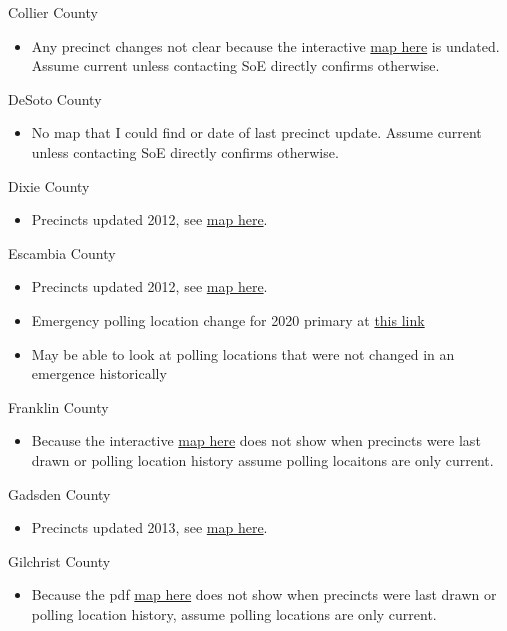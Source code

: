 \documentclass[12pt]{article}
\begin{document}
Collier County
\begin{itemize}
  \item Any precinct changes not clear because the interactive \href{https://www.colliervotes.com/Voting-System-Maps-Stats/Precinct-Map-Voting-Boundaries}{map here} is undated. Assume current unless contacting SoE directly confirms otherwise.
\end{itemize}
DeSoto County
\begin{itemize}
  \item No map that I could find or date of last precinct update. Assume current unless contacting SoE directly confirms otherwise.
\end{itemize}
Dixie County
\begin{itemize}
  \item Precincts updated 2012, see \href{https://www.dixievotes.com/Portals/Dixie/Documents/Maps/Precinct2012.pdf?ver=2014-06-04-143440-740}{map here}.
\end{itemize}
Escambia County
\begin{itemize}
  \item Precincts updated 2012, see \href{https://escambiavotes.com/docs/default-source/aws/Precincts_by_District_Combined.pdf}{map here}.
  \item Emergency polling location change for 2020 primary at \href{https://escambiavotes.com/news/2020/03/11/polling-location-change}{this link}
  \item May be able to look at polling locations that were not changed in an emergence historically
\end{itemize}
Franklin County
\begin{itemize}
  \item Because the interactive \href{https://www.arcgis.com/apps/webappviewer/index.html?id=02420ce7216f440a9b509e63510bfd9f}{map here} does not show when precincts were last drawn or polling location history assume polling locaitons are only current.
\end{itemize}
Gadsden County
\begin{itemize}
  \item Precincts updated 2013, see \href{https://www.voterfocus.com/PrecinctFinder/precinctDirectory?county=FL-GAD}{map here}.
\end{itemize}
Gilchrist County
\begin{itemize}
  \item Because the pdf \href{https://www.votegilchrist.com/Portals/Gilchrist/Documents/cm_voter__comm_dist.pdf}{map here} does not show when precincts were last drawn or polling location history, assume polling locations are only current.
\end{itemize}
\end{document}
